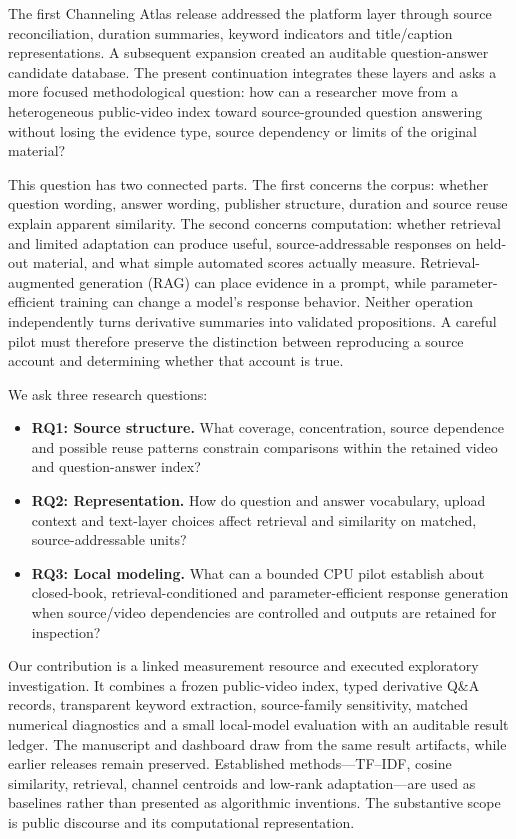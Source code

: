 The first Channeling Atlas release addressed the platform layer through source reconciliation, duration summaries, keyword indicators and title/caption representations. A subsequent expansion created an auditable question-answer candidate database. The present continuation integrates these layers and asks a more focused methodological question: how can a researcher move from a heterogeneous public-video index toward source-grounded question answering without losing the evidence type, source dependency or limits of the original material?

This question has two connected parts. The first concerns the corpus: whether question wording, answer wording, publisher structure, duration and source reuse explain apparent similarity. The second concerns computation: whether retrieval and limited adaptation can produce useful, source-addressable responses on held-out material, and what simple automated scores actually measure. Retrieval-augmented generation (RAG) can place evidence in a prompt, while parameter-efficient training can change a model's response behavior. Neither operation independently turns derivative summaries into validated propositions. A careful pilot must therefore preserve the distinction between reproducing a source account and determining whether that account is true.

We ask three research questions:
\begin{itemize}
\item \textbf{RQ1: Source structure.} What coverage, concentration, source dependence and possible reuse patterns constrain comparisons within the retained video and question-answer index?
\item \textbf{RQ2: Representation.} How do question and answer vocabulary, upload context and text-layer choices affect retrieval and similarity on matched, source-addressable units?
\item \textbf{RQ3: Local modeling.} What can a bounded CPU pilot establish about closed-book, retrieval-conditioned and parameter-efficient response generation when source/video dependencies are controlled and outputs are retained for inspection?
\end{itemize}

Our contribution is a linked measurement resource and executed exploratory investigation. It combines a frozen public-video index, typed derivative Q\&A records, transparent keyword extraction, source-family sensitivity, matched numerical diagnostics and a small local-model evaluation with an auditable result ledger. The manuscript and dashboard draw from the same result artifacts, while earlier releases remain preserved. Established methods---TF--IDF, cosine similarity, retrieval, channel centroids and low-rank adaptation---are used as baselines rather than presented as algorithmic inventions. The substantive scope is public discourse and its computational representation.

